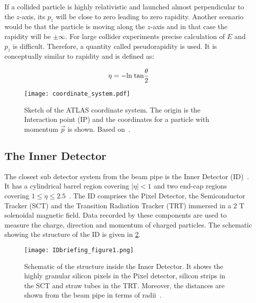 If a collided particle is highly relativistic and launched almost perpendicular to the $z$-axis, its $p_z$ will be close to zero leading to zero rapidity.
Another scenario would be that the particle is moving along the $z$-axis and in that case the rapidity will be $\pm \infty$. For large
collider experiments precise calculation of $E$ and $p_z$ is difficult. Therefore, a quantity called pseudorapidity is used. It is conceptually similar to 
rapidity and is defined as:

\begin{equation}
    \eta = -\text{ln}\hspace{0.1cm}\text{tan}\frac{\theta}{2}
\end{equation}

\begin{figure}[htbp]
    \centering
    \texttt{[image: coordinate\_system.pdf]}
    \caption[Sketch of the ATLAS coordinate system]{Sketch of the ATLAS coordinate system. 
    The origin is the Interaction point (IP) and the coordinates for a particle 
    with momentum $\vec{p}$ is shown. Based on~\cite{coordinatesys}.}%
    \label{fig:coordinatesys}
\end{figure}

\subsection{The Inner Detector}
The closest sub detector system from the beam pipe is the Inner Detector (ID)~\cite{CERN-LHCC-97-016}. It has a cylindrical 
barrel region covering $|\eta|<1$ and two end-cap regions covering 
$1 \leq \eta \leq 2.5$~\cite{BARBERIS2000331}. The ID comprises the Pixel Detector, the Semiconductor 
Tracker (SCT) and the Transition Radiation Tracker (TRT) immersed in a 2 T solenoidal 
magnetic field. Data recorded by these components are used to measure the charge, direction and 
momentum of charged particles. The schematic showing the structure of the ID is given in \cref{fig:ID}.

\begin{figure}[htbp]
    \centering
    \texttt{[image: IDbriefing\_figure1.png]}
    \caption[Sketch of the ATLAS Inner Detector]{Schematic of the structure inside the Inner
    Detector. It shows the highly granular silicon pixels in the Pixel detector, silicon strips in the
    SCT and straw tubes in the TRT. Moreover, the distances are shown from the beam pipe in 
    terms of radii~\cite{Collaboration:2723878}.}%
    \label{fig:ID}
\end{figure}


